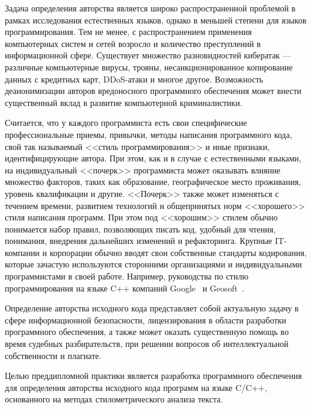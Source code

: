Задача определения авторства является широко распространенной проблемой в рамках исследования 
естественных языков, однако в меньшей степени для языков программирования. 
Тем не менее, с распространением применения компьютерных систем и сетей возросло и количество преступлений в 
информационной сфере. Существует множество разновидностей кибератак --- различные компьютерные вирусы, 
трояны, несанкционированное копирование данных с кредитных карт, DDoS-атаки и многое другое. 
Возможность деанонимизации авторов вредоносного программного обеспечения может внести существенный вклад 
в развитие компьютерной криминалистики.

Считается, что у каждого программиста есть свои специфические профессиональные приемы, 
привычки, методы написания программного кода, свой так называемый <<стиль программирования>> и 
иные признаки, идентифицирующие автора. При этом, как и в случае с естественными языками, 
на индивидуальный <<почерк>> программиста может оказывать влияние
множество факторов, таких как образование, географическое место проживания, уровень квалификации и другие. 
<<Почерк>> также может изменяться с течением времени, развитием технологий и общепринятых норм <<хорошего>> стиля
написания программ. При этом под <<хорошим>> стилем обычно понимается набор правил, позволяющих писать 
код, удобный для чтения, понимания, внедрения дальнейших изменений и рефакторинга.
Крупные IT-компании и корпорации обычно вводят свои собственные стандарты кодирования, которые  
зачастую используются сторонними организациями и индивидуальными программистами в своей работе.
Например, руководства по стилю программирования на языке C++ компаний Google~\cite{google_style} и Geosoft~\cite{geosoft}.


Определение авторства исходного кода представляет собой актуальную задачу в сфере информационной 
безопасности, лицензирования в области разработки программного обеспечения, а также может оказать 
существенную помощь во время судебных разбирательств, при решении вопросов об интеллектуальной 
собственности и плагиате.

Целью преддипломной практики является разработка программного обеспечения для определения авторства 
исходного кода программ на языке C/C++, основанного на методах стилометрического анализа текста.
